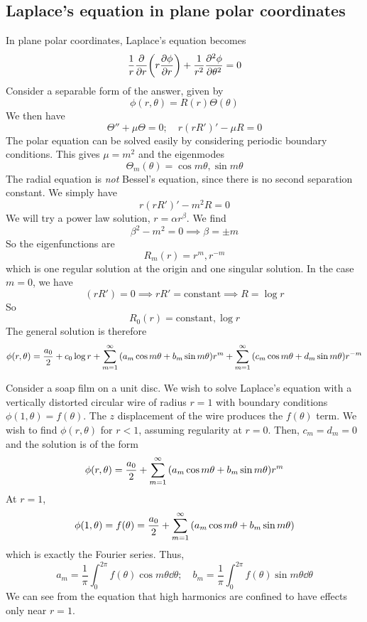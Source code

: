 \subsection{Laplace's equation in plane polar coordinates}
In plane polar coordinates, Laplace's equation becomes
\[
	\frac{1}{r} \pdv{r} \qty(r \pdv{\phi}{r}) + \frac{1}{r^2} \pdv[2]{\phi}{\theta} = 0
\]
Consider a separable form of the answer, given by
\[
	\phi(r,\theta) = R(r) \Theta(\theta)
\]
We then have
\[
	\Theta'' + \mu \Theta = 0;\quad r(rR')' - \mu R = 0
\]
The polar equation can be solved easily by considering periodic boundary conditions.
This gives \( \mu = m^2 \) and the eigenmodes
\[
	\Theta_m(\theta) = \cos m \theta, \sin m \theta
\]
The radial equation is \textit{not} Bessel's equation, since there is no second separation constant.
We simply have
\[
	r(rR')' - m^2 R = 0
\]
We will try a power law solution, \( r = \alpha r^\beta \).
We find
\[
	\beta^2 - m^2 = 0 \implies \beta = \pm m
\]
So the eigenfunctions are
\[
	R_m(r) = r^m, r^{-m}
\]
which is one regular solution at the origin and one singular solution.
In the case \( m = 0 \), we have
\[
	(rR') = 0 \implies rR' = \text{constant} \implies R = \log r
\]
So
\[
	R_0(r) = \text{constant}, \log r
\]
The general solution is therefore
\[
	\phi(r,\theta) = \frac{a_0}{2} + c_0 \log r + \sum_{m=1}^\infty \qty(a_m \cos m\theta + b_m \sin m\theta) r^m + \sum_{m=1}^\infty \qty(c_m \cos m\theta + d_m \sin m\theta) r^{-m}
\]
\begin{example}
	Consider a soap film on a unit disc.
	We wish to solve Laplace's equation with a vertically distorted circular wire of radius \( r = 1 \) with boundary conditions \( \phi(1, \theta) = f(\theta) \).
	The \( z \) displacement of the wire produces the \( f(\theta) \) term.
	We wish to find \( \phi(r,\theta) \) for \( r < 1 \), assuming regularity at \( r = 0 \).
	Then, \( c_m = d_m = 0 \) and the solution is of the form
	\[
		\phi(r,\theta) = \frac{a_0}{2} + \sum_{m=1}^\infty \qty(a_m \cos m\theta + b_m \sin m\theta) r^m
	\]
	At \( r = 1 \),
	\[
		\phi(1,\theta) = f(\theta) = \frac{a_0}{2} + \sum_{m=1}^\infty \qty(a_m \cos m\theta + b_m \sin m\theta)
	\]
	which is exactly the Fourier series.
	Thus,
	\[
		a_m = \frac{1}{\pi} \int_0^{2\pi} f(\theta) \cos m \theta \dd{\theta};\quad b_m = \frac{1}{\pi} \int_0^{2\pi} f(\theta) \sin m \theta \dd{\theta}
	\]
	We can see from the equation that high harmonics are confined to have effects only near \( r = 1 \).
\end{example}

